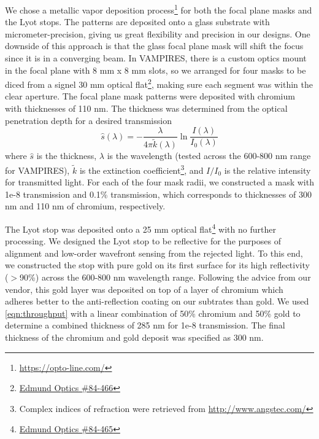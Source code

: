 \documentclass[12pt]{spieman}  %
\begin{document}
\begin{spacing}{2}
We chose a metallic vapor deposition process\footnote{\url{https://opto-line.com/}} for both the focal plane masks and the Lyot stops. The patterns are deposited onto a glass substrate with micrometer-precision, giving us great flexibility and precision in our designs. One downside of this approach is that the glass focal plane mask will shift the focus since it is in a converging beam. In VAMPIRES, there is a custom optics mount in the focal plane with 8 mm x 8 mm slots, so we arranged for four masks to be diced from a signel 30 mm optical flat\footnote{\href{https://www.edmundoptics.com/p/30mm-dia-4mm-thick-nir-i-coated-lambda10-fused-silica-window/27562/}{Edmund Optics \#84-466}}, making sure each segment was within the clear aperture. The focal plane mask patterns were deposited with chromium with thicknesses of 110 nm. The thickness was determined from the optical penetration depth for a desired transmission
\begin{equation}
    \hat{s}(\lambda) = -\frac{\lambda}{4\pi\tilde{k}(\lambda)}\ln{\frac{I(\lambda)}{I_0(\lambda)}}
    \label{eqn:throughput}
\end{equation}
where $\hat{s}$ is the thickness, $\lambda$ is the wavelength (tested across the 600-800 nm range for VAMPIRES), $\tilde{k}$ is the extinction coefficient\footnote{Complex indices of refraction were retrieved from \url{http://www.angstec.com/}}, and $I/I_0$ is the relative intensity for transmitted light. For each of the four mask radii, we constructed a mask with 1e-8 transmission and 0.1\% transmission, which corresponds to thicknesses of 300 nm and 110 nm of chromium, respectively.

The Lyot stop was deposited onto a 25 mm optical flat\footnote{\href{https://www.edmundoptics.com/p/25mm-dia-3mm-thick-nir-i-coated-lambda10-fused-silica-window/27561/}{Edmund Optics \#84-465}} with no further processing. We designed the Lyot stop to be reflective for the purposes of alignment and low-order wavefront sensing from the rejected light. To this end, we constructed the stop with pure gold on its first surface for its high reflectivity ($>$90\%) across the 600-800 nm wavelength range. Following the advice from our vendor, this gold layer was deposited on top of a layer of chromium which adheres better to the anti-reflection coating on our subtrates than gold. We used \autoref{eqn:throughput} with a linear combination of 50\% chromium and 50\% gold to determine a combined thickness of 285 nm for 1e-8 transmission. The final thickness of the chromium and gold deposit was specified as 300 nm.


\end{spacing}
\end{document}
